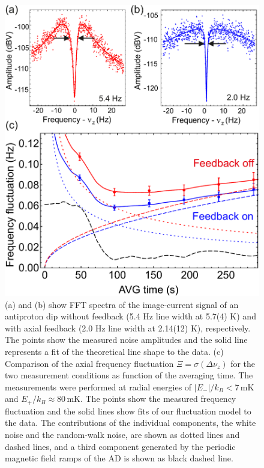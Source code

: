 \documentclass[12pt,preprint%
]{elsarticle}
\begin{document}
\begin{figure}[htb]
        \centerline{\includegraphics[width=0.48 \textwidth,keepaspectratio]{FIG2SSF.pdf}}
            \caption[Filter]{
						(a) and (b) show FFT spectra of the image-current signal of an antiproton dip without feedback (5.4 Hz line width at 5.7(4) K) and with axial feedback (2.0 Hz line width at 2.14(12) K), respectively. The points show the measured noise amplitudes and the solid line represents a fit of the theoretical line shape to the data. (c) Comparison of the axial frequency fluctuation $\Xi = \sigma(\Delta\nu_z)$ for the two measurement conditions as function of the averaging time. The measurements were performed at radial energies of $|E_-|/k_B < 7\,$mK and $E_+/k_B \approx 80\,$mK. 
						The points show the measured frequency fluctuation and the solid lines show fits of our fluctuation model to the data. The contributions of the individual components, the white noise and the random-walk noise, are shown as dotted lines and dashed lines, and a third component generated by the periodic magnetic field ramps of the AD is shown as black dashed line.} 
						\label{fig2a}
    \end{figure}
\end{document}
